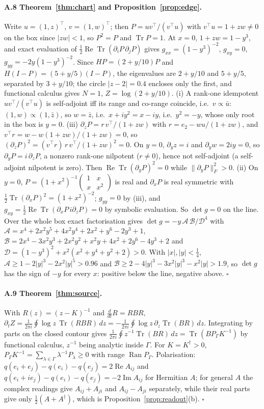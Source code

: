 \documentclass[11pt]{article}
\theoremstyle{definition}
\newcommand{\Tr}{\operatorname{Tr}}
\newcommand{\F}[1]{\lVert #1\rVert_F}
\begin{document}
\paragraph{A.8 Theorem~\ref{thm:chart} and Proposition~\ref{prop:edge}.} Write $u=(1,z)^\top$, $v=(1,w)^\top$; then $P=uv^\top/(v^\top u)$ with $v^\top u=1+zw\ne0$ on the box since $|zw|<1$, so $P^2=P$ and $\Tr P=1$. At $x=0$, $1+zw=1-y^3$, and exact evaluation of $\tfrac12\operatorname{Re}\Tr(\partial_iP\,\partial_jP)$ gives $g_{xx}=(1-y^3)^{-2}$, $g_{xy}=0$, $g_{yy}=-2y(1-y^3)^{-2}$. Since $HP=(2+y/10)P$ and $H(I-P)=(5+y/5)(I-P)$, the eigenvalues are $2+y/10$ and $5+y/5$, separated by $3+y/10$; the circle $|z-2|=0.4$ encloses only the first, and functional calculus gives $N=1$, $Z=\log(2+y/10)$. (i) A rank-one idempotent $uv^\top/(v^\top u)$ is self-adjoint iff its range and co-range coincide, i.e.\ $v\propto\bar u$: $(1,w)\propto(1,\bar z)$, so $w=\bar z$, i.e.\ $x+iy^2=x-iy$, i.e.\ $y^2=-y$, whose only root in the box is $y=0$. (iii) $\partial_zP=r\,v^\top/(1+zw)$ with $r=e_2-wu/(1+zw)$, and $v^\top r=w-w(1+zw)/(1+zw)=0$, so $(\partial_zP)^2=(v^\top r)\,r\,v^\top/(1+zw)^2=0$. On $y=0$, $\partial_yz=i$ and $\partial_yw=2iy=0$, so $\partial_yP=i\,\partial_zP$, a nonzero rank-one nilpotent ($r\ne0$), hence not self-adjoint (a self-adjoint nilpotent is zero). Then $\operatorname{Re}\Tr(\partial_yP)^2=0$ while $\F{\partial_yP}^2>0$. (ii) On $y=0$, $P=(1+x^2)^{-1}\begin{pmatrix}1&x\\x&x^2\end{pmatrix}$ is real and $\partial_xP$ is real symmetric with $\tfrac12\Tr(\partial_xP)^2=(1+x^2)^{-2}$; $g_{yy}=0$ by (iii), and $g_{xy}=\tfrac12\operatorname{Re}\Tr(\partial_xP\,i\partial_zP)=0$ by symbolic evaluation. So $\det g=0$ on the line. Over the whole box exact factorisation gives $\det g=-y\,\mathcal A\,\mathcal B/\mathcal D^4$ with $\mathcal A=x^4+2x^2y^5+4x^2y^4+2x^2+y^6-2y^3+1$, $\mathcal B=2x^4-3x^2y^3+2x^2y^2+x^2y+4x^2+2y^6-4y^3+2$ and $\mathcal D=(1-y^3)^2+x^2(x^2+y^4+y^2+2)>0$. With $|x|,|y|<\tfrac14$, $\mathcal A\ge1-2|y|^3-2x^2|y|^5>0.96$ and $\mathcal B\ge2-4|y|^3-3x^2|y|^3-x^2|y|>1.9$, so $\det g$ has the sign of $-y$ for every $x$: positive below the line, negative above. $\square$

\paragraph{A.9 Theorem~\ref{thm:source}.} With $R(z)=(z-K)^{-1}$ and $\frac d{dt}R=RBR$, $\partial_tZ=\frac1{2\pi i}\oint\log z\,\Tr(RBR)\,dz=-\frac1{2\pi i}\oint\log z\,\partial_z\Tr(BR)\,dz$. Integrating by parts on the closed contour gives $\frac1{2\pi i}\oint z^{-1}\Tr(BR)\,dz=\Tr(BP_\Gamma K^{-1})$ by functional calculus, $z^{-1}$ being analytic inside $\Gamma$. For $K=K^\dagger>0$, $P_\Gamma K^{-1}=\sum_{\lambda\in\Gamma}\lambda^{-1}P_\lambda\ge0$ with range $\operatorname{Ran}P_\Gamma$. Polarisation: $q(e_i+e_j)-q(e_i)-q(e_j)=2\operatorname{Re}A_{ij}$ and $q(e_i+ie_j)-q(e_i)-q(e_j)=-2\operatorname{Im}A_{ij}$ for Hermitian $A$; for general $A$ the complex readings give $A_{ij}+A_{ji}$ and $A_{ij}-A_{ji}$ separately, while their real parts give only $\tfrac12(A+A^\dagger)$, which is Proposition~\ref{prop:readout}(b). $\square$
\end{document}
